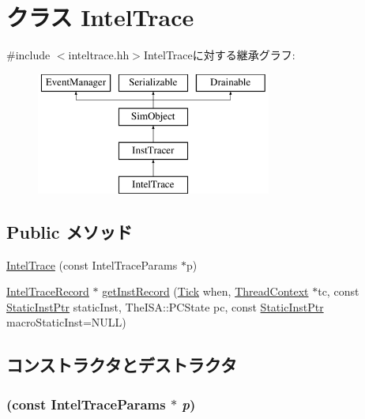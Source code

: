 \hypertarget{classTrace_1_1IntelTrace}{
\section{クラス IntelTrace}
\label{classTrace_1_1IntelTrace}
}


{\ttfamily \#include $<$inteltrace.hh$>$}IntelTraceに対する継承グラフ:\begin{figure}[H]
\begin{center}
\leavevmode
\includegraphics[height=4cm]{classTrace_1_1IntelTrace}
\end{center}
\end{figure}
\subsection*{Public メソッド}
\begin{DoxyCompactItemize}
\item 
\hyperlink{classTrace_1_1IntelTrace_a213706ff1f751f1d75e9ecbe273cb39a}{IntelTrace} (const IntelTraceParams $\ast$p)
\item 
\hyperlink{classTrace_1_1IntelTraceRecord}{IntelTraceRecord} $\ast$ \hyperlink{classTrace_1_1IntelTrace_a244eaae9f6eb0042457439e5ad31c8f5}{getInstRecord} (\hyperlink{base_2types_8hh_a5c8ed81b7d238c9083e1037ba6d61643}{Tick} when, \hyperlink{classThreadContext}{ThreadContext} $\ast$tc, const \hyperlink{classRefCountingPtr}{StaticInstPtr} staticInst, TheISA::PCState pc, const \hyperlink{classRefCountingPtr}{StaticInstPtr} macroStaticInst=NULL)
\end{DoxyCompactItemize}


\subsection{コンストラクタとデストラクタ}
\hypertarget{classTrace_1_1IntelTrace_a213706ff1f751f1d75e9ecbe273cb39a}{
\subsubsection[{IntelTrace}]{ (const IntelTraceParams $\ast$ {\em p})}}
\label{classTrace_1_1IntelTrace_a213706ff1f751f1d75e9ecbe273cb39a}



